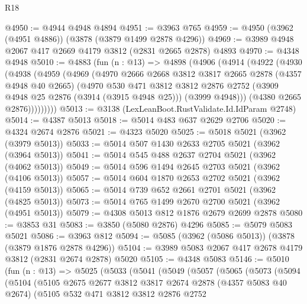 \begin{lexlean}{R18}
\begin{coremodule}
@4950 := @4944 @4948 @4894
@4951 := @3963 @765
@4959 := @4950 (@3962 (@4951 @4886)) (@3878 (@3879 @1499 @2878 @4296))
@4969 := @3989 @4948 @2067 @417 @2669 @4179 @3812 (@2831 @2665 @2878) @4893
@4970 := @4348 @4948
@5010 := @4883
    (fun (n : @13) =>
    @4898
      (@4906
        (@4914
          (@4922
            (@4930
              (@4938
                (@4959
                  (@4969
                    (@4970
                      @2666
                      @2668
                      @3812
                      @3817
                      @2665
                      @2878
                      (@4357 @4948 @40 @2665)
                      (@4970
                        @530
                        @471
                        @3812
                        @3812
                        @2876
                        @2752
                        (@3909 @4948 @25 @2876 (@3914 (@3915 @4948 @25)))
                        (@3999 @4948)))
                    (@4380 @2665 @2876)))))))))
@5013 := @3138 (LexLeanBoot.RustValidate.Id.IdParam @2748)
@5014 := @4387 @5013
@5018 := @5014 @483 @637 @2629 @2706
@5020 := @4324 @2674 @2876
@5021 := @4323 @5020
@5025 := @5018 @5021 (@3962 (@3979 @5013))
@5033 := @5014 @507 @1430 @2633 @2705 @5021 (@3962 (@3964 @5013))
@5041 := @5014 @545 @488 @2637 @2704 @5021 (@3962 (@4062 @5013))
@5049 := @5014 @596 @1494 @2645 @2703 @5021 (@3962 (@4106 @5013))
@5057 := @5014 @604 @1870 @2653 @2702 @5021 (@3962 (@4159 @5013))
@5065 := @5014 @739 @652 @2661 @2701 @5021 (@3962 (@4825 @5013))
@5073 := @5014 @765 @1499 @2670 @2700 @5021 (@3962 (@4951 @5013))
@5079 := @4308 @5013 @812 @1876 @2679 @2699 @2878
@5080 := @3853 @31
@5083 := @3850 (@5080 @2876) @4296
@5085 := @5079 @5083 @5021
@5086 := @3963 @812
@5094 := @5085 (@3962 (@5086 @5013)) (@3878 (@3879 @1876 @2878 @4296))
@5104 := @3989 @5083 @2067 @417 @2678 @4179 @3812 (@2831 @2674 @2878) @5020
@5105 := @4348 @5083
@5146 := @5010
    (fun (n : @13) =>
    @5025
      (@5033
        (@5041
          (@5049
            (@5057
              (@5065
                (@5073
                  (@5094
                    (@5104
                      (@5105
                        @2675
                        @2677
                        @3812
                        @3817
                        @2674
                        @2878
                        (@4357 @5083 @40 @2674)
                        (@5105
                          @532
                          @471
                          @3812
                          @3812
                          @2876
                          @2752

\end{coremodule}
\end{lexlean}
